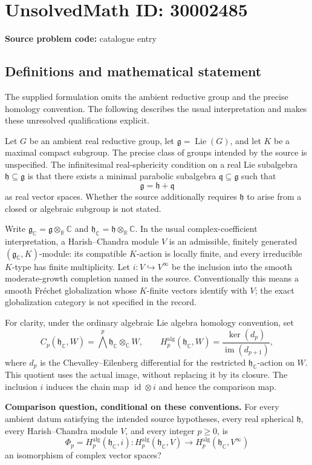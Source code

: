\documentclass[11pt]{article}
\newcommand{\R}{\mathbb{R}}
\newcommand{\C}{\mathbb{C}}
\begin{document}
\section*{UnsolvedMath ID: 30002485}
\textbf{Source problem code:} catalogue entry
\subsection{Definitions and mathematical statement}
The supplied formulation omits the ambient reductive group and the precise homology convention. The following describes the usual interpretation and makes these unresolved qualifications explicit.

Let \(G\) be an ambient real reductive group, let \(\mathfrak g=\operatorname{Lie}(G)\), and let \(K\) be a maximal compact subgroup. The precise class of groups intended by the source is unspecified. The infinitesimal real-sphericity condition on a real Lie subalgebra \(\mathfrak h\subseteq\mathfrak g\) is that there exists a minimal parabolic subalgebra \(\mathfrak q\subseteq\mathfrak g\) such that
\[
\mathfrak g=\mathfrak h+\mathfrak q
\]
as real vector spaces. Whether the source additionally requires \(\mathfrak h\) to arise from a closed or algebraic subgroup is not stated.

Write \(\mathfrak g_{\C}=\mathfrak g\otimes_{\R}\C\) and \(\mathfrak h_{\C}=\mathfrak h\otimes_{\R}\C\). In the usual complex-coefficient interpretation, a Harish--Chandra module \(V\) is an admissible, finitely generated \((\mathfrak g_{\C},K)\)-module: its compatible \(K\)-action is locally finite, and every irreducible \(K\)-type has finite multiplicity. Let \(i:V\hookrightarrow V^{\infty}\) be the inclusion into the smooth moderate-growth completion named in the source. Conventionally this means a smooth Fr\'echet globalization whose \(K\)-finite vectors identify with \(V\); the exact globalization category is not specified in the record.

For clarity, under the ordinary algebraic Lie algebra homology convention, set
\[
C_p(\mathfrak h_{\C},W)=\bigwedge^p\mathfrak h_{\C}\otimes_{\C}W,
\qquad
H_p^{\mathrm{alg}}(\mathfrak h_{\C},W)
=\frac{\ker(d_p)}{\operatorname{im}(d_{p+1})},
\]
where \(d_p\) is the Chevalley--Eilenberg differential for the restricted \(\mathfrak h_{\C}\)-action on \(W\). This quotient uses the actual image, without replacing it by its closure. The inclusion \(i\) induces the chain map \(\operatorname{id}\otimes i\) and hence the comparison map.

\textbf{Comparison question, conditional on these conventions.} For every ambient datum satisfying the intended source hypotheses, every real spherical \(\mathfrak h\), every Harish--Chandra module \(V\), and every integer \(p\geq 0\), is
\[
\Phi_p=H_p^{\mathrm{alg}}(\mathfrak h_{\C},i):
H_p^{\mathrm{alg}}(\mathfrak h_{\C},V)
\longrightarrow
H_p^{\mathrm{alg}}(\mathfrak h_{\C},V^{\infty})
\]
an isomorphism of complex vector spaces?
\end{document}
